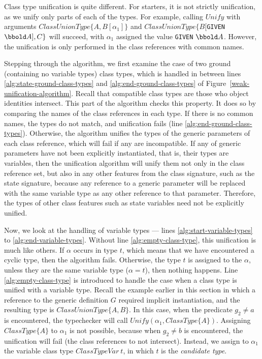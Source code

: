 Class type unification is quite different. For starters, it is not
strictly unification, as we unify only parts of each of the types. For
example, calling $Unify$ with arguments $ClassUnionType \{A,
B[\alpha_1]\}$ and $ClassUnionType \{B[${\tt GIVEN} $\arithmos], C\}$
will succeed, with $\alpha_1$ assigned the value {\tt GIVEN}
$\arithmos$. However, the unification is only performed in the class
references with common names.

Stepping through the algorithm, we first examine the case of two
ground (containing no variable types) class types, which is handled in
between lines \ref{alg:state-ground-class-types} and
\ref{alg:end-ground-class-types} of
Figure~\ref{weak-unification-algorithm}. Recall that compatible class
types are those who object identities intersect. This part of the
algorithm checks this property. It does so by comparing the names of
the class references in each type. If there is no common names, the
types do not match, and unification fails (line
\ref{alg:end-ground-class-types}). Otherwise, the algorithm unifies
the types of the generic parameters of each class reference, which
will fail if any are incompatible. If any of generic parameters have
not been explicitly instantiated, that is, their types are variables,
then the unification algorithm will unify them not only in the class
reference set, but also in any other features from the class
signature, such as the state signature, because any reference to a
generic parameter will be replaced with the same variable type as any
other reference to that parameter. Therefore, the types of other class
features such as state variables need not be explicitly unified.

Now, we look at the handling of variable types --- lines
\ref{alg:start-variable-types} to
\ref{alg:end-variable-types}. Without line \ref{alg:empty-class-type},
this unification is much like others. If $\alpha$ occurs in type $t$,
which means that we have encountered a cyclic type, then the algorithm
fails. Otherwise, the type $t$ is assigned to the $\alpha$, unless
they are the same variable type ($\alpha = t$), then nothing
happens. Line \ref{alg:empty-class-type} is introduced to handle the
case when a class type is unified with a variable type. Recall the
example earlier in this section in which a reference to the generic
definition $G$ required implicit instantiation, and the resulting type
is $ClassUnionType \{A, B\}$. In this case, when the predicate $g_2
\neq a$ is encountered, the typechecker will call $Unify(\alpha_1,
ClassType\{A\})$. Assigning $ClassType\{A\}$ to $\alpha_1$ is not
possible, because when $g_2 \neq b$ is encountered, the unification
will fail (the class references to not intersect). Instead, we assign
to $\alpha_1$ the variable class type $ClassTypeVar~t$, in which
$t$ is the {\em candidate type}.


